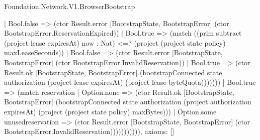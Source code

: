 \begin{lexlean}{Foundation.Network.V1.BrowserBootstrap}
\begin{semanticmodule}
{                        | Bool.false => (ctor Result.error [BootstrapState, BootstrapError] (ctor BootstrapError.ReservationExpired))
                        | Bool.true => (match ((prim subtract (project lease expiresAt) now : Nat) <=? (project (project state policy) maxLeaseSeconds))
                          | Bool.false => (ctor Result.error [BootstrapState, BootstrapError] (ctor BootstrapError.InvalidReservation))
                          | Bool.true => (ctor Result.ok [BootstrapState, BootstrapError] (bootstrapConnected state authorization (project lease expiresAt) (project lease byteQuota)))))))
                  | Bool.true => (match reservation
                    | Option.none => (ctor Result.ok [BootstrapState, BootstrapError] (bootstrapConnected state authorization (project authorization expiresAt) (project (project state policy) maxBytes)))
                    | Option.some unusedreservation => (ctor Result.error [BootstrapState, BootstrapError] (ctor BootstrapError.InvalidReservation))))))))))),
  axioms: []
}


\end{semanticmodule}
\end{lexlean}
